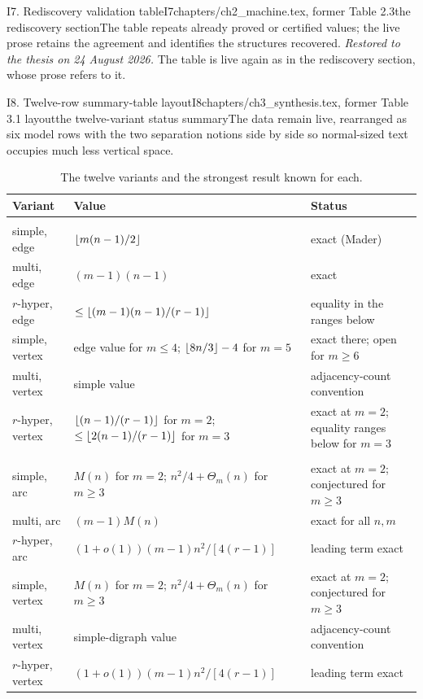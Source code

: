 \begin{offcut}{I7. Rediscovery validation table}{I7}{chapters/ch2\_machine.tex, former Table 2.3}{the rediscovery section}{The table repeats already proved or certified values; the live prose retains the agreement and identifies the structures recovered.}
\emph{Restored to the thesis on 24 August 2026.} The table is live again as  in the rediscovery section, whose prose refers to it.
\end{offcut}

\begin{offcut}{I8. Twelve-row summary-table layout}{I8}{chapters/ch3\_synthesis.tex, former Table 3.1 layout}{the twelve-variant status summary}{The data remain live, rearranged as six model rows with the two separation notions side by side so normal-sized text occupies much less vertical space.}
\begin{table}[p]
\centering
\renewcommand{\arraystretch}{1.12}
\begin{tabularx}{\textwidth}{@{}>{\raggedright\arraybackslash}p{}>{\raggedright\arraybackslash}p{}X@{}}
\toprule
Variant & Value & Status \\
\midrule
\multicolumn{3}{@{}l}{\emph{Undirected}} \\
simple, edge & $\left\lfloor m(n-1)/2 \right\rfloor$ & exact (Mader) \\
multi, edge & $(m-1)(n-1)$ & exact \\
$r$-hyper, edge & $\le\left\lfloor (m-1)(n-1)/(r-1) \right\rfloor$ & equality in the ranges below \\
simple, vertex & edge value for $m\le4$; $\left\lfloor 8n/3 \right\rfloor-4$ for $m=5$ & exact there; open for $m\ge6$ \\
multi, vertex & simple value & adjacency-count convention \\
$r$-hyper, vertex & $\left\lfloor (n-1)/(r-1) \right\rfloor$ for $m=2$; $\le\left\lfloor 2(n-1)/(r-1) \right\rfloor$ for $m=3$ & exact at $m=2$; equality ranges below for $m=3$ \\
\midrule
\multicolumn{3}{@{}l}{\emph{Directed}} \\
simple, arc & $M(n)$ for $m=2$; $n^2/4+\Theta_m(n)$ for $m\ge3$ & exact at $m=2$; conjectured for $m\ge3$ \\
multi, arc & $(m-1)M(n)$ & exact for all $n,m$ \\
$r$-hyper, arc & $(1+o(1))(m-1)n^2/[4(r-1)]$ & leading term exact \\
simple, vertex & $M(n)$ for $m=2$; $n^2/4+\Theta_m(n)$ for $m\ge3$ & exact at $m=2$; conjectured for $m\ge3$ \\
multi, vertex & simple-digraph value & adjacency-count convention \\
$r$-hyper, vertex & $(1+o(1))(m-1)n^2/[4(r-1)]$ & leading term exact \\
\bottomrule
\end{tabularx}
\caption{The twelve variants and the strongest result known for each.}
\label{offcut:i:tab:summary-tall}
\end{table}
\end{offcut}


